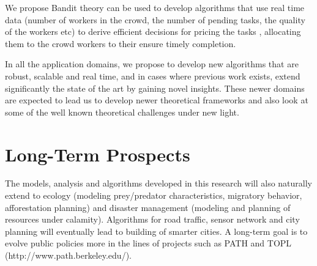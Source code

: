 We propose Bandit theory can be used to develop algorithms that use real time data (number of workers in the crowd, the number of pending tasks, the quality of the workers etc) to derive efficient decisions for pricing the tasks \cite{hcompwork}, allocating them to the crowd workers to their ensure timely completion.\par
In all the application domains, we propose to develop new algorithms that are robust, scalable and real time, and in cases where previous work exists, extend significantly the state of the art by gaining novel insights. These newer domains are expected to lead us to develop newer theoretical frameworks and also look at some of the well known theoretical challenges under new light.
\section{Long-Term Prospects}
The models, analysis and algorithms developed in this research will also naturally extend to ecology (modeling prey/predator characteristics, migratory behavior, afforestation planning) and disaster management (modeling and planning of resources under calamity). Algorithms for road traffic, sensor network and city planning will eventually lead to building of smarter cities. A long-term goal is to evolve public policies more in the lines of projects such as PATH and TOPL (http://www.path.berkeley.edu/).
\small



